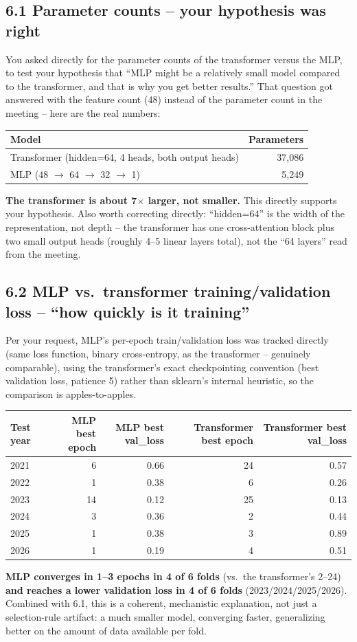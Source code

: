 \documentclass[11pt]{article}
\begin{document}
\subsection*{6.1 Parameter counts -- your hypothesis was right}
You asked directly for the parameter counts of the transformer versus the MLP, to test your hypothesis that
``MLP might be a relatively small model compared to the transformer, and that is why you get better
results.'' That question got answered with the feature count (48) instead of the parameter count in the
meeting -- here are the real numbers:
\begin{table}[H]
\centering
\begin{tabular}{lr}
\toprule
Model & Parameters \\
\midrule
Transformer (hidden=64, 4 heads, both output heads) & 37,086 \\
MLP (48 $\to$ 64 $\to$ 32 $\to$ 1) & 5,249 \\
\bottomrule
\end{tabular}
\end{table}
\textbf{The transformer is about 7$\times$ larger, not smaller.} This directly supports your hypothesis.
Also worth correcting directly: ``hidden=64'' is the width of the representation, not depth -- the
transformer has one cross-attention block plus two small output heads (roughly 4--5 linear layers total),
not the ``64 layers'' read from the meeting.

\subsection*{6.2 MLP vs.\ transformer training/validation loss -- ``how quickly is it training''}
Per your request, MLP's per-epoch train/validation loss was tracked directly (same loss function, binary
cross-entropy, as the transformer -- genuinely comparable), using the transformer's exact checkpointing
convention (best validation loss, patience 5) rather than sklearn's internal heuristic, so the comparison
is apples-to-apples.
\begin{table}[H]
\centering
\begin{tabular}{lrrrr}
\toprule
Test year & MLP best epoch & MLP best val\_loss & Transformer best epoch & Transformer best val\_loss \\
\midrule
2021 & 6 & 0.66 & 24 & 0.57 \\
2022 & 1 & 0.38 & 6 & 0.26 \\
2023 & 14 & 0.12 & 25 & 0.13 \\
2024 & 3 & 0.36 & 2 & 0.44 \\
2025 & 1 & 0.38 & 3 & 0.89 \\
2026 & 1 & 0.19 & 4 & 0.51 \\
\bottomrule
\end{tabular}
\end{table}
\textbf{MLP converges in 1--3 epochs in 4 of 6 folds} (vs.\ the transformer's 2--24) \textbf{and reaches a
lower validation loss in 4 of 6 folds} (2023/2024/2025/2026). Combined with 6.1, this is a coherent,
mechanistic explanation, not just a selection-rule artifact: a much smaller model, converging faster,
generalizing better on the amount of data available per fold.
\end{document}

